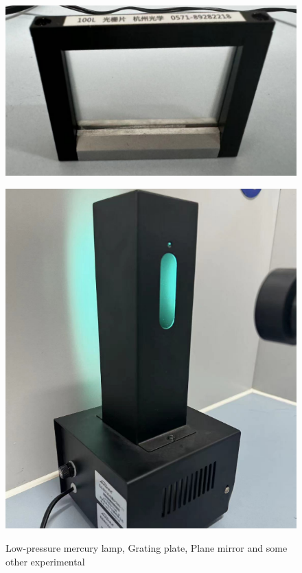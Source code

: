 \documentclass[UTF8]{article}
\begin{document}
          	 \begin{figure}[H]
                \begin{minipage}[t]{0.66\linewidth}
                   \centering
                   \includegraphics[clip,scale=0.7,trim={20 0 20 0}]{fig/fig5.png}
                   \label{figure.11}
                \end{minipage}
                \begin{minipage}[t]{0.33\linewidth}
                   \centering
                   \includegraphics[clip,scale=0.5,trim={0 0 0 0}]{fig/fig6.png}
                   \label{figure.12}
                \end{minipage}  
    	      \caption{Low-pressure mercury lamp, Grating plate, Plane mirror and some other experimental}
             \end{figure} 
 
\end{document}
